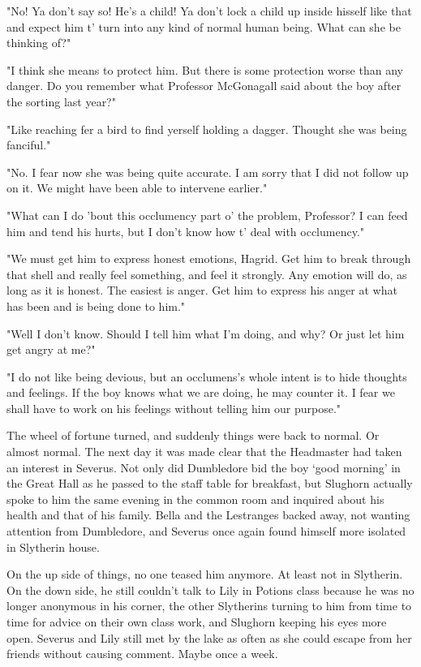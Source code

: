 \documentclass[a4paper,11pt]{article}
\begin{document}
"No! Ya don't say so! He's a child! Ya don't lock a child up inside hisself like that and expect him t' turn into any kind of normal human being. What can she be thinking of?"

"I think she means to protect him. But there is some protection worse than any danger. Do you remember what Professor McGonagall said about the boy after the sorting last year?"

"Like reaching fer a bird to find yerself holding a dagger. Thought she was being fanciful."

"No. I fear now she was being quite accurate. I am sorry that I did not follow up on it. We might have been able to intervene earlier."

"What can I do 'bout this occlumency part o' the problem, Professor? I can feed him and tend his hurts, but I don't know how t' deal with occlumency."

"We must get him to express honest emotions, Hagrid. Get him to break through that shell and really feel something, and feel it strongly. Any emotion will do, as long as it is honest. The easiest is anger. Get him to express his anger at what has been and is being done to him."

"Well I don't know. Should I tell him what I'm doing, and why? Or just let him get angry at me?"

"I do not like being devious, but an occlumens's whole intent is to hide thoughts and feelings. If the boy knows what we are doing, he may counter it. I fear we shall have to work on his feelings without telling him our purpose."

The wheel of fortune turned, and suddenly things were back to normal. Or almost normal. The next day it was made clear that the Headmaster had taken an interest in Severus. Not only did Dumbledore bid the boy `good morning' in the Great Hall as he passed to the staff table for breakfast, but Slughorn actually spoke to him the same evening in the common room and inquired about his health and that of his family. Bella and the Lestranges backed away, not wanting attention from Dumbledore, and Severus once again found himself more isolated in Slytherin house.

On the up side of things, no one teased him anymore. At least not in Slytherin. On the down side, he still couldn't talk to Lily in Potions class because he was no longer anonymous in his corner, the other Slytherins turning to him from time to time for advice on their own class work, and Slughorn keeping his eyes more open. Severus and Lily still met by the lake as often as she could escape from her friends without causing comment. Maybe once a week.
\end{document}
